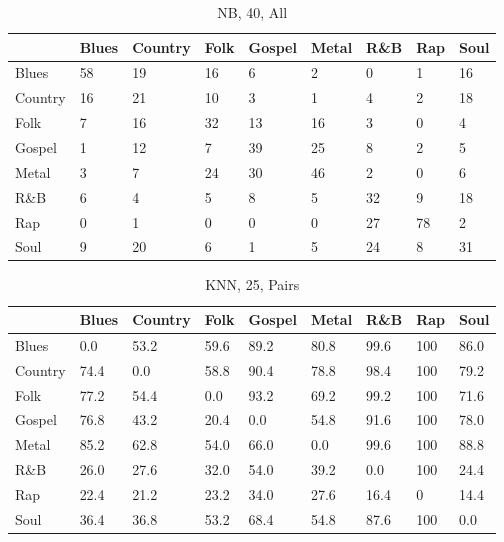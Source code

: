 \documentclass[a4paper,oneside]{article}
\begin{document}
\begin{table}[H]
\caption{NB, 40, All}
\begin{tabu}{l|*{8}{l}}
 & Blues & Country & Folk & Gospel & Metal & R\&B & Rap & Soul \\ \hline
Blues & 58 & 19 & 16 & 6 & 2 & 0 & 1 & 16 \\
Country & 16 & 21 & 10 & 3 & 1 & 4 & 2 & 18 \\
Folk & 7 & 16 & 32 & 13 & 16 & 3 & 0 & 4 \\
Gospel & 1 & 12 & 7 & 39 & 25 & 8 & 2 & 5 \\
Metal & 3 & 7 & 24 & 30 & 46 & 2 & 0 & 6 \\
R\&B & 6 & 4 & 5 & 8 & 5 & 32 & 9 & 18 \\
Rap & 0 & 1 & 0 & 0 & 0 & 27 & 78 & 2 \\
Soul & 9 & 20 & 6 & 1 & 5 & 24 & 8 & 31 \\
\end{tabu}
\end{table}

\begin{table}[H]
\caption{KNN, 25, Pairs}
\begin{tabu}{l|*{8}{l}}
 & Blues & Country & Folk & Gospel & Metal & R\&B & Rap & Soul \\ \hline
Blues & 0.0 & 53.2 & 59.6 & 89.2 & 80.8 & 99.6 & 100 & 86.0 \\
Country & 74.4 & 0.0 & 58.8 & 90.4 & 78.8 & 98.4 & 100 & 79.2 \\
Folk & 77.2 & 54.4 & 0.0 & 93.2 & 69.2 & 99.2 & 100 & 71.6 \\
Gospel & 76.8 & 43.2 & 20.4 & 0.0 & 54.8 & 91.6 & 100 & 78.0 \\
Metal & 85.2 & 62.8 & 54.0 & 66.0 & 0.0 & 99.6 & 100 & 88.8 \\
R\&B & 26.0 & 27.6 & 32.0 & 54.0 & 39.2 & 0.0 & 100 & 24.4 \\
Rap & 22.4 & 21.2 & 23.2 & 34.0 & 27.6 & 16.4 & 0 & 14.4 \\
Soul & 36.4 & 36.8 & 53.2 & 68.4 & 54.8 & 87.6 & 100 & 0.0 \\
\end{tabu}
\end{table}
\end{document}
